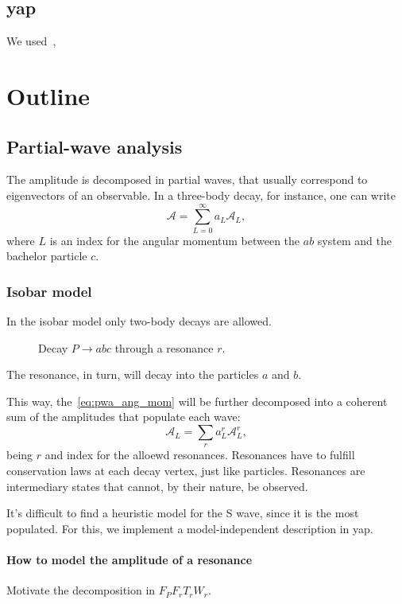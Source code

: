 \documentclass[
	fontsize=10pt,
	open=right,
	twoside,
    english,
    draft,
]{scrbook}
\newcommand{\A}{\ensuremath{\mathcal{A}}}
\begin{document}
\section{\acs{yap}}

We used~\cite{stl_meyers,effective_cpp_meyers},

\chapter{Outline}
    \section{Partial-wave analysis}
    The amplitude is decomposed in partial waves, that usually correspond to eigenvectors of an observable.
    In a three-body decay, for instance, one can write
    \begin{equation}\label{eq:pwa_ang_mom}
        \A = \sum_{L=0}^\infty a_L \A_L,
    \end{equation}
    where $L$ is an index for the angular momentum between the $ab$ system and the bachelor particle $c$.

    \subsection{Isobar model}
    In the isobar model only two-body decays are allowed.
    \begin{figure}
        \centering
        
        \caption{Decay $P\to abc$ through a resonance $r$.}
    \end{figure}
    The resonance, in turn, will decay into the particles $a$ and $b$.


    This way, the~\eqref{eq:pwa_ang_mom} will be further decomposed into a coherent sum of the amplitudes that populate each wave:
    \begin{equation}
        \A_L = \sum_r a_L^r \A_L^r,
    \end{equation}
    being $r$ and index for the alloewd resonances.
    Resonances have to fulfill conservation laws at each decay vertex, just like particles.
    Resonances are intermediary states that cannot, by their nature, be observed.



    It's difficult to find a heuristic model for the S wave, since it is the most populated.
    For this, we implement a model-independent description in \ac{yap}.

        \subsubsection{How to model the amplitude of a resonance}
        Motivate the decomposition in $F_P F_r T_r W_r$.
\end{document}
